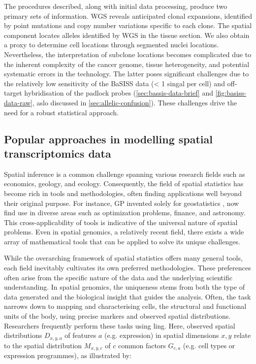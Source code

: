 The procedures described, along with initial data processing, produce two primary sets of information. \ac{WGS} reveals anticipated clonal expansions, identified by point mutations and copy number variations specific to each clone. The spatial component locates alleles identified by \ac{WGS} in the tissue section. We also obtain a proxy to determine cell locations through segmented nuclei locations. Nevertheless, the interpretation of subclone locations becomes complicated due to the inherent complexity of the cancer genome, tissue heterogeneity, and potential systematic errors in the technology. The latter poses significant challenges due to the relatively low sensitivity of the \ac{BaSISS} data (< 1 singal per cell) and off-target hybridisation of the padlock probes (\cref{sec:bassis-data-brief} and \cref{fig:basiss-data-raw}, aslo discussed in \cref{sec:allelic-confusion}). These challenges drive the need for a robust statistical approach.

\subsection{Popular approaches in modelling spatial transcriptomics data}
\label{sec:basiss-popular}
Spatial inference is a common challenge spanning various research fields such as economics, geology, and ecology. Consequently, the field of spatial statistics has become rich in tools and methodologies, often finding applications well beyond their original purpose. For instance, \acl{GP} invented solely for geostatistics \parencite{Krige1951-mt}, now find use in diverse areas such as optimization problems, finance, and astronomy. This cross-applicability of tools is indicative of the universal nature of spatial problems. Even in spatial genomics, a relatively recent field, there exists a wide array of mathematical tools that can be applied to solve its unique challenges.
    
While the overarching framework of spatial statistics offers many general tools, each field inevitably cultivates its own preferred methodologies. These preferences often arise from the specific nature of the data and the underlying scientific understanding. In spatial genomics, the uniqueness stems from both the type of data generated and the biological insight that guides the analysis. Often, the task narrows down to mapping and characterising cells, the structural and functional units of the body, using precise markers and observed spatial distributions. Researchers frequently perform these tasks using ling. Here, observed spatial distributions $D_{x,y,a}$ of features $a$ (e.g. expression) in spatial dimensions $x, y$ relate to the spatial distribution $M_{x,y,c}$ of $c$ common factors $G_{c,a}$ (e.g. cell types or expression programmes), as illustrated by:

